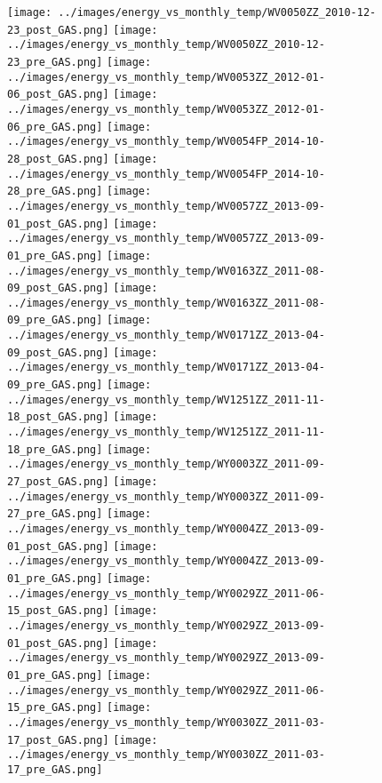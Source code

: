 \clearpage
\begin{figure}
\centering
\texttt{[image: ../images/energy\_vs\_monthly\_temp/WV0050ZZ\_2010-12-23\_post\_GAS.png]}
\texttt{[image: ../images/energy\_vs\_monthly\_temp/WV0050ZZ\_2010-12-23\_pre\_GAS.png]}
\texttt{[image: ../images/energy\_vs\_monthly\_temp/WV0053ZZ\_2012-01-06\_post\_GAS.png]}
\texttt{[image: ../images/energy\_vs\_monthly\_temp/WV0053ZZ\_2012-01-06\_pre\_GAS.png]}
\texttt{[image: ../images/energy\_vs\_monthly\_temp/WV0054FP\_2014-10-28\_post\_GAS.png]}
\texttt{[image: ../images/energy\_vs\_monthly\_temp/WV0054FP\_2014-10-28\_pre\_GAS.png]}
\texttt{[image: ../images/energy\_vs\_monthly\_temp/WV0057ZZ\_2013-09-01\_post\_GAS.png]}
\texttt{[image: ../images/energy\_vs\_monthly\_temp/WV0057ZZ\_2013-09-01\_pre\_GAS.png]}
\texttt{[image: ../images/energy\_vs\_monthly\_temp/WV0163ZZ\_2011-08-09\_post\_GAS.png]}
\texttt{[image: ../images/energy\_vs\_monthly\_temp/WV0163ZZ\_2011-08-09\_pre\_GAS.png]}
\texttt{[image: ../images/energy\_vs\_monthly\_temp/WV0171ZZ\_2013-04-09\_post\_GAS.png]}
\texttt{[image: ../images/energy\_vs\_monthly\_temp/WV0171ZZ\_2013-04-09\_pre\_GAS.png]}
\texttt{[image: ../images/energy\_vs\_monthly\_temp/WV1251ZZ\_2011-11-18\_post\_GAS.png]}
\texttt{[image: ../images/energy\_vs\_monthly\_temp/WV1251ZZ\_2011-11-18\_pre\_GAS.png]}
\texttt{[image: ../images/energy\_vs\_monthly\_temp/WY0003ZZ\_2011-09-27\_post\_GAS.png]}
\texttt{[image: ../images/energy\_vs\_monthly\_temp/WY0003ZZ\_2011-09-27\_pre\_GAS.png]}
\texttt{[image: ../images/energy\_vs\_monthly\_temp/WY0004ZZ\_2013-09-01\_post\_GAS.png]}
\texttt{[image: ../images/energy\_vs\_monthly\_temp/WY0004ZZ\_2013-09-01\_pre\_GAS.png]}
\texttt{[image: ../images/energy\_vs\_monthly\_temp/WY0029ZZ\_2011-06-15\_post\_GAS.png]}
\texttt{[image: ../images/energy\_vs\_monthly\_temp/WY0029ZZ\_2013-09-01\_post\_GAS.png]}
\texttt{[image: ../images/energy\_vs\_monthly\_temp/WY0029ZZ\_2013-09-01\_pre\_GAS.png]}
\texttt{[image: ../images/energy\_vs\_monthly\_temp/WY0029ZZ\_2011-06-15\_pre\_GAS.png]}
\texttt{[image: ../images/energy\_vs\_monthly\_temp/WY0030ZZ\_2011-03-17\_post\_GAS.png]}
\texttt{[image: ../images/energy\_vs\_monthly\_temp/WY0030ZZ\_2011-03-17\_pre\_GAS.png]}
\end{figure}
\clearpage
